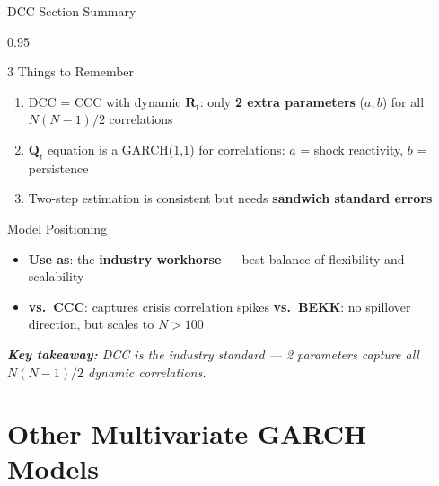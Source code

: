 \documentclass[9pt, aspectratio=169, t]{beamer}
\begin{document}
\begin{frame}{DCC Section Summary}
    \begin{cminipage}{0.95\textwidth}
    {\footnotesize
    \begin{block}{3 Things to Remember}
        \begin{enumerate}\setlength{\itemsep}{2pt}
            \item DCC = CCC with dynamic $\mathbf{R}_t$: only \textbf{2 extra parameters} ($a, b$) for all $N(N-1)/2$ correlations
            \item $\mathbf{Q}_t$ equation is a GARCH(1,1) for correlations: $a$ = shock reactivity, $b$ = persistence
            \item Two-step estimation is consistent but needs \textbf{sandwich standard errors}
        \end{enumerate}
    \end{block}
    \begin{alertblock}{Model Positioning}
        \begin{itemize}\setlength{\itemsep}{0pt}
            \item \textbf{Use as}: the \textbf{industry workhorse} --- best balance of flexibility and scalability
            \item \textbf{vs.\ CCC}: captures crisis correlation spikes \quad \textbf{vs.\ BEKK}: no spillover direction, but scales to $N > 100$
        \end{itemize}
    \end{alertblock}
    \vspace{1mm}
    \textit{\textbf{Key takeaway:} DCC is the industry standard --- 2 parameters capture all $N(N-1)/2$ dynamic correlations.}
    }
    \end{cminipage}
\end{frame}

\section{Other Multivariate GARCH Models}
\end{document}
